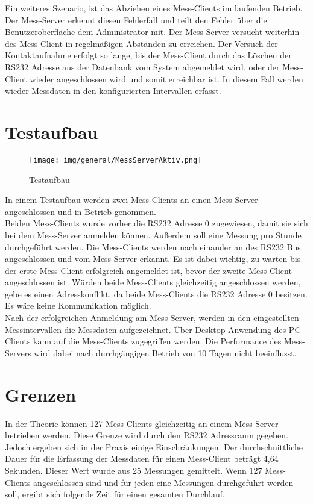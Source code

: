 Ein weiteres Szenario, ist das Abziehen eines Mess-Clients im laufenden Betrieb. Der Mess-Server erkennt diesen Fehlerfall und teilt den Fehler über die Benutzeroberfläche dem Administrator mit. Der Mess-Server versucht weiterhin des Mess-Client in regelmäßigen Abständen zu erreichen. Der Versuch der Kontaktaufnahme erfolgt so lange, bis der Mess-Client durch das Löschen der RS232 Adresse aus der Datenbank vom System abgemeldet wird, oder der Mess-Client wieder angeschlossen wird und somit erreichbar ist. In diesem Fall werden wieder Messdaten in den konfigurierten Intervallen erfasst.

\section{Testaufbau}

\begin{figure}[H]
\begin{center}
\texttt{[image: img/general/MessServerAktiv.png]}
\caption{Testaufbau}
\label{figure_Testaufbau}
\end{center}
\end{figure}

In einem Testaufbau werden zwei Mess-Clients an einen Mess-Server angeschlossen und in Betrieb genommen. \\
Beiden Mess-Clients wurde vorher die RS232 Adresse 0 zugewiesen, damit sie sich bei dem Mess-Server anmelden können. Außerdem soll eine Messung pro Stunde durchgeführt werden. Die Mess-Clients werden nach einander an des RS232 Bus angeschlossen und vom Mess-Server erkannt. Es ist dabei wichtig, zu warten bis der erste Mess-Client erfolgreich angemeldet ist, bevor der zweite Mess-Client angeschlossen ist. Würden beide Mess-Clients gleichzeitig angeschlossen werden, gebe es einen Adresskonflikt, da beide Mess-Clients die RS232 Adresse 0 besitzen. Es wäre keine Kommunikation möglich.\\
Nach der erfolgreichen Anmeldung am Mess-Server, werden in den eingestellten Messintervallen die Messdaten aufgezeichnet. Über Desktop-Anwendung des PC-Clients kann auf die Mess-Clients zugegriffen werden. Die Performance des Mess-Servers wird dabei nach durchgängigen Betrieb von 10 Tagen nicht beeinflusst. 

\section{Grenzen}

In der Theorie können 127 Mess-Clients gleichzeitig an einem Mess-Server betrieben werden. Diese Grenze wird durch den RS232 Adressraum gegeben. Jedoch ergeben sich in der Praxis einige Einschränkungen. Der durchschnittliche Dauer für die Erfassung der Messdaten für einen Mess-Client beträgt 4,64 Sekunden. Dieser Wert wurde aus 25 Messungen gemittelt. Wenn 127 Mess-Clients angeschlossen sind und für jeden eine Messungen durchgeführt werden soll, ergibt sich folgende Zeit für einen gesamten Durchlauf.\ 

